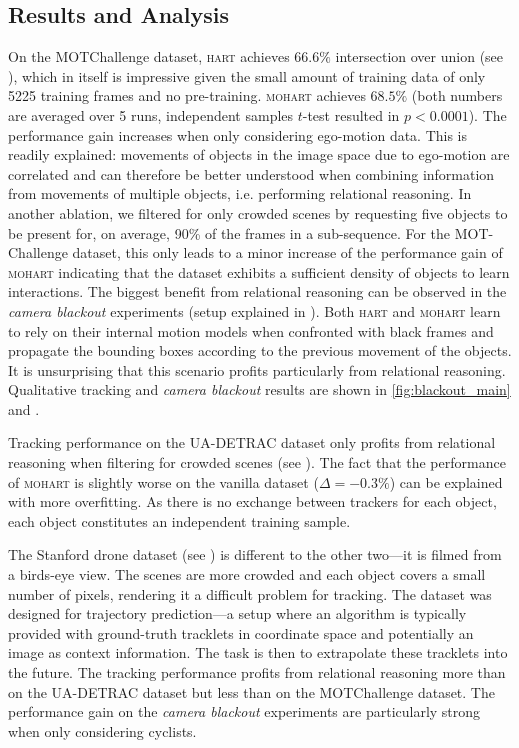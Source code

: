 \subsection{Results and Analysis}


On the MOTChallenge dataset, \textsc{hart} achieves $66.6\%$ intersection over union (see ), which in itself is impressive given the small amount of training data of only 5225 training frames and no pre-training. \textsc{mohart} achieves $68.5\%$ (both numbers are averaged over 5 runs, independent samples $t$-test resulted in $p < 0.0001$). The performance gain increases when only considering ego-motion data. This is readily explained: movements of objects in the image space due to ego-motion are correlated and can therefore be better understood when combining information from movements of multiple objects, i.e. performing relational reasoning. In another ablation, we filtered for only crowded scenes by requesting five objects to be present for, on average, 90\% of the frames in a sub-sequence. For the MOT-Challenge dataset, this only leads to a minor increase of the performance gain of \textsc{mohart} indicating that the dataset exhibits a sufficient density of objects to learn interactions. The biggest benefit from relational reasoning can be observed in the \textit{camera blackout} experiments (setup explained in ). Both \textsc{hart} and \textsc{mohart} learn to rely on their internal motion models when confronted with black frames and propagate the bounding boxes according to the previous movement of the objects. It is unsurprising that this scenario profits particularly from relational reasoning. Qualitative tracking and \textit{camera blackout} results are shown in \cref{fig:blackout_main} and .

Tracking performance on the UA-DETRAC dataset only profits from relational reasoning when filtering for crowded scenes (see ). The fact that the performance of \textsc{mohart} is slightly worse on the vanilla dataset ($\Delta = -0.3\%$) can be explained with more overfitting. As there is no exchange between trackers for each object, each object constitutes an independent training sample.

The Stanford drone dataset (see ) is different to the other two---it is filmed from a birds-eye view.
The scenes are more crowded and each object covers a small number of pixels, rendering it a difficult problem for tracking.
The dataset was designed for trajectory prediction---a setup where an algorithm is typically provided with ground-truth tracklets in coordinate space and potentially an image as context information. The task is then to extrapolate these tracklets into the future. The tracking performance profits from relational reasoning more than on the UA-DETRAC dataset but less than on the MOTChallenge dataset. The performance gain on the \textit{camera blackout} experiments are particularly strong when only considering cyclists. 

